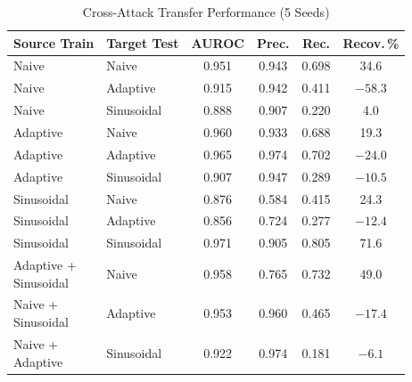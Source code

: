 \documentclass[journal]{IEEEtran}
\begin{document}
\begin{table}[!t]
\centering
\caption{Cross-Attack Transfer Performance (5 Seeds)}
\label{tab:transfer}
\footnotesize
\renewcommand{\arraystretch}{1.12}
\setlength{\tabcolsep}{2.5pt}
\begin{tabular*}{\columnwidth}{@{\extracolsep{\fill}}llcccc@{}}
\toprule
\textbf{Source Train} & \textbf{Target Test} & \textbf{AUROC} & \textbf{Prec.} & \textbf{Rec.} & \textbf{Recov.\,\%} \\
\midrule
 Naive & Naive & 0.951 & 0.943 & 0.698 & 34.6 \\
 Naive & Adaptive & 0.915 & 0.942 & 0.411 & $-58.3$ \\
 Naive & Sinusoidal & 0.888 & 0.907 & 0.220 & 4.0 \\
 Adaptive & Naive & 0.960 & 0.933 & 0.688 & 19.3 \\
 Adaptive & Adaptive & 0.965 & 0.974 & 0.702 & $-24.0$ \\
 Adaptive & Sinusoidal & 0.907 & 0.947 & 0.289 & $-10.5$ \\
 Sinusoidal & Naive & 0.876 & 0.584 & 0.415 & 24.3 \\
 Sinusoidal & Adaptive & 0.856 & 0.724 & 0.277 & $-12.4$ \\
 Sinusoidal & Sinusoidal & 0.971 & 0.905 & 0.805 & 71.6 \\
\midrule
 \shortstack[l]{Adaptive +\\Sinusoidal} & Naive & 0.958 & 0.765 & 0.732 & 49.0 \\
 \shortstack[l]{Naive +\\Sinusoidal} & Adaptive & 0.953 & 0.960 & 0.465 & $-17.4$ \\
 \shortstack[l]{Naive +\\Adaptive} & Sinusoidal & 0.922 & 0.974 & 0.181 & $-6.1$ \\
\bottomrule
\end{tabular*}
\end{table}
\end{document}
